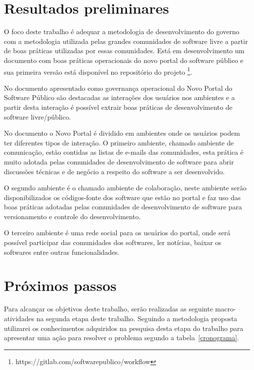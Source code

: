 \section{Resultados preliminares}

O foco deste trabalho é adequar a metodologia de desenvolvimento do governo com a
metodologia utilizada pelas grandes comunidades de software livre a partir de boas 
práticas utilizadas por essas comunidades.
Está em desenvolvimento um documento com boas práticas operacionais do novo portal 
do software público e sua primeira versão está disponível no repositório do projeto
\footnote{https://gitlab.com/softwarepublico/workflow}.

No documento apresentado como governança operacional do Novo Portal do Software Público
são destacadas as interações dos usuários nos ambientes e a partir desta interação é 
possível extrair boas práticas de desenvolvimento de software livre/público.

No documento o Novo Portal é dividido em ambientes onde os usuários podem ter diferentes 
tipos de interação. O primeiro ambiente, chamado ambiente de comunicação, estão contidas 
as listas de e-mails das comunidades, esta prática é muito adotada pelas comunidades
de desenvolvimento de software para abrir discussões técnicas e de negócio a respeito do 
software a ser desenvolvido.

O segundo ambiente é o chamado ambiente de colaboração, neste ambiente serão disponibilizados
os códigos-fonte dos software que estão no portal e faz uso das boas práticas adotadas pelas 
comunidades de desenvolvimento de software para versionamento e controle do desenvolvimento.

O terceiro ambiente é uma rede social para os usuários do portal, onde será possível participar
das comunidades dos softwares, ler notícias, baixar os softwares entre outras funcionalidades.   




\section{Próximos passos}

Para alcançar os objetivos deste trabalho, serão realizadas as seguinte macro-atividades
na segunda etapa deste trabalho. Seguindo a metodologia proposta utilizarei os conhecimentos
adquiridos na pesquisa desta etapa do trabalho para apresentar uma ação para resolver o 
problema segundo a tabela~\ref{cronograma}.


